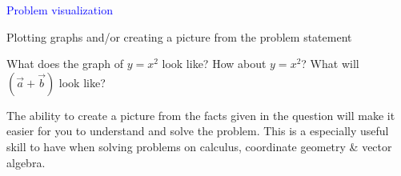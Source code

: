 \documentclass[14pt,fleqn]{extarticle}
\begin{document}
\begin{skill}
\textcolor{blue}{Problem visualization}

Plotting graphs and/or creating a picture from the problem statement
\end{skill}

\newcard 

What does the graph of $y=x^2$ look like? How about $y = x^2$? What will $\left(\vec{a} + \vec{b} \right)$ look like? \newline 

The ability to create a picture from the facts given in the question will make it easier for you to understand and solve the problem. This is a especially useful skill to have when solving problems on calculus, coordinate geometry \& vector algebra. 
\end{document}

